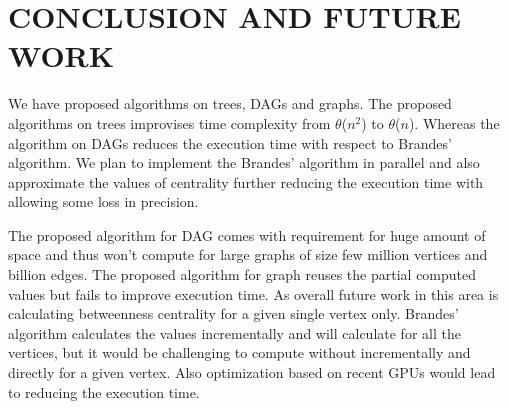 \chapter{CONCLUSION AND FUTURE WORK}
\label{chap:concl}

We have proposed algorithms on trees, DAGs and graphs.
The proposed algorithms on trees improvises time complexity from $\theta$($n^2$) to $\theta$($n$). Whereas the algorithm on DAGs reduces the execution time with respect to Brandes' algorithm. We plan to implement the Brandes' algorithm in parallel and also approximate the values of centrality further reducing the execution time with allowing some loss in precision.

The proposed algorithm for DAG comes with requirement for huge amount of space and thus won't compute for large graphs of size few million vertices and billion edges. The proposed algorithm for graph reuses the partial computed values but fails to improve execution time.
As overall future work in this area is calculating betweenness centrality for a given single vertex only. Brandes' algorithm calculates the values incrementally and will calculate for all the vertices, but it would be challenging to compute without incrementally and directly for a given vertex. Also optimization based on recent GPUs would lead to reducing the execution time.